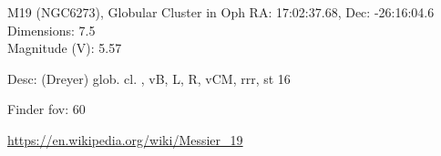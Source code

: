 \begin{block}{M19 (NGC6273), Globular Cluster in Oph}
    RA: 17:02:37.68, Dec: -26:16:04.6 \\ 
    Dimensions: 7.5 \\ 
    Magnitude (V): 5.57


    Desc: (Dreyer) glob. cl. , vB, L, R, vCM, rrr, st 16 

    Finder fov: 60 

    \url{https://en.wikipedia.org/wiki/Messier_19} 
\end{block}